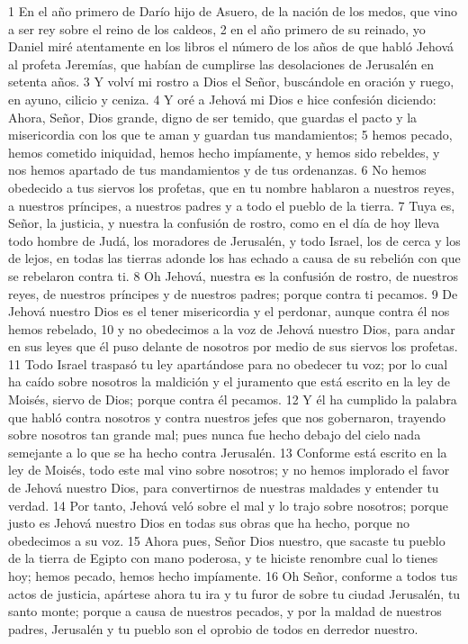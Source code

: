 1 En el año primero de Darío hijo de Asuero, de la nación de los medos, que vino a ser rey sobre el reino de los caldeos,
2 en el año primero de su reinado, yo Daniel miré atentamente en los libros el número de los años de que habló Jehová al profeta Jeremías, que habían de cumplirse las desolaciones de Jerusalén en setenta años. 
3 Y volví mi rostro a Dios el Señor, buscándole en oración y ruego, en ayuno, cilicio y ceniza.
4 Y oré a Jehová mi Dios e hice confesión diciendo: Ahora, Señor, Dios grande, digno de ser temido, que guardas el pacto y la misericordia con los que te aman y guardan tus mandamientos;
5 hemos pecado, hemos cometido iniquidad, hemos hecho impíamente, y hemos sido rebeldes, y nos hemos apartado de tus mandamientos y de tus ordenanzas.
6 No hemos obedecido a tus siervos los profetas, que en tu nombre hablaron a nuestros reyes, a nuestros príncipes, a nuestros padres y a todo el pueblo de la tierra.
7 Tuya es, Señor, la justicia, y nuestra la confusión de rostro, como en el día de hoy lleva todo hombre de Judá, los moradores de Jerusalén, y todo Israel, los de cerca y los de lejos, en todas las tierras adonde los has echado a causa de su rebelión con que se rebelaron contra ti.
8 Oh Jehová, nuestra es la confusión de rostro, de nuestros reyes, de nuestros príncipes y de nuestros padres; porque contra ti pecamos.
9 De Jehová nuestro Dios es el tener misericordia y el perdonar, aunque contra él nos hemos rebelado,
10 y no obedecimos a la voz de Jehová nuestro Dios, para andar en sus leyes que él puso delante de nosotros por medio de sus siervos los profetas.
11 Todo Israel traspasó tu ley apartándose para no obedecer tu voz; por lo cual ha caído sobre nosotros la maldición y el juramento que está escrito en la ley de Moisés, siervo de Dios; porque contra él pecamos.
12 Y él ha cumplido la palabra que habló contra nosotros y contra nuestros jefes que nos gobernaron, trayendo sobre nosotros tan grande mal; pues nunca fue hecho debajo del cielo nada semejante a lo que se ha hecho contra Jerusalén.
13 Conforme está escrito en la ley de Moisés, todo este mal vino sobre nosotros; y no hemos implorado el favor de Jehová nuestro Dios, para convertirnos de nuestras maldades y entender tu verdad.
14 Por tanto, Jehová veló sobre el mal y lo trajo sobre nosotros; porque justo es Jehová nuestro Dios en todas sus obras que ha hecho, porque no obedecimos a su voz.
15 Ahora pues, Señor Dios nuestro, que sacaste tu pueblo de la tierra de Egipto con mano poderosa, y te hiciste renombre cual lo tienes hoy; hemos pecado, hemos hecho impíamente.
16 Oh Señor, conforme a todos tus actos de justicia, apártese ahora tu ira y tu furor de sobre tu ciudad Jerusalén, tu santo monte; porque a causa de nuestros pecados, y por la maldad de nuestros padres, Jerusalén y tu pueblo son el oprobio de todos en derredor nuestro.
